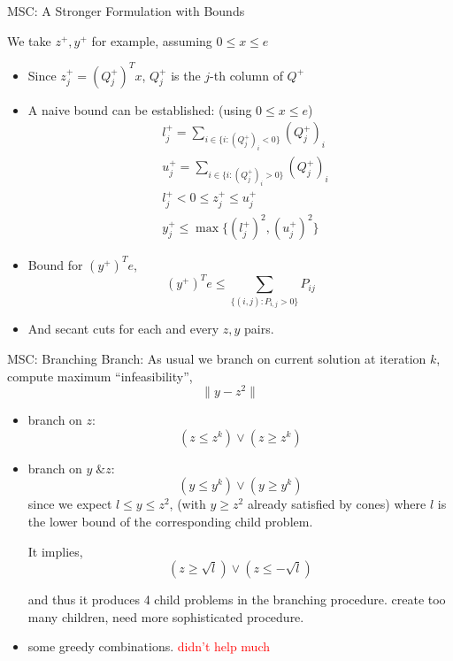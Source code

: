 \begin{frame}{MSC: A Stronger Formulation with Bounds}

  We take \(z^+, y^+\) for example, assuming \(0\le x\le e\)
  \begin{itemize}
    \item Since \(z^+_j = (Q^+_j)^T x\), \(Q^+_j\) is the \(j\)-th column of \(Q^+\)
    \item A naive bound can be established: (using \(0 \le x \le e\))
          \[\begin{aligned}
               & l^+_j = \sum_{i\in\{i: (Q^+_j)_i < 0\}} (Q^+_j)_i \\
               & u^+_j = \sum_{i\in\{i: (Q^+_j)_i > 0\}} (Q^+_j)_i \\
               & l^+_j < 0 \le z^+_j \le  u^+_j                    \\
               & y^+_j \le \max \{(l^+_j)^2, (u^+_j)^2\}
            \end{aligned}
          \]
    \item Bound for \((y^+)^T e\),
          \[(y^+)^T e \le \sum_{\{(i,j): P_{i,j} > 0 \}} P_{ij} \]
    \item And secant cuts for each and every \(z, y\) pairs.
  \end{itemize}

\end{frame}

\begin{frame}{MSC: Branching}
  Branch:
  As usual we branch on current solution at iteration \(k\), compute maximum ``infeasibility'',
  \[ \|y - z^2\|\]
  \begin{itemize}
    \item branch on \(z\):
          \[ \left(z \le z^k \right)  \vee \left(z \ge z^k \right)  \]
    \item branch on \(y\; \& z\):
          \[ \left(y \le y^k  \right)  \vee \left (y \ge y^k \right)  \]
          since we expect \(l \le y \le z^2\), (with \(y \ge z^2\) already satisfied by cones)
          where \(l\) is the lower bound of the corresponding child problem.

          It implies,
          \[
            \left(z \ge \sqrt{l} \right) \vee \left( z \le -\sqrt{l} \right)
          \]

          and thus it produces 4 child problems in the branching procedure.
          create too many children, need more sophisticated procedure.
    \item some greedy combinations. \textcolor{red}{didn't help much}
  \end{itemize}
\end{frame}


